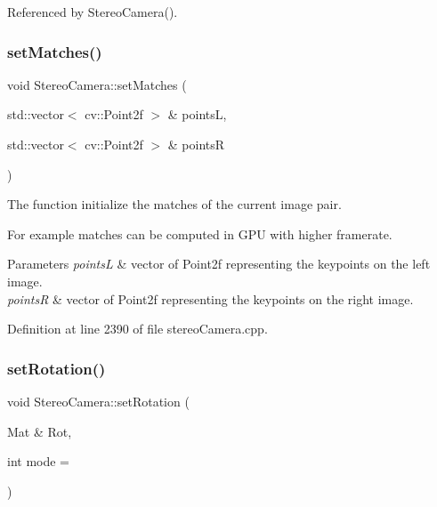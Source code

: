 Referenced by Stereo\+Camera().

\mbox{\label{classStereoCamera_ae683fafa11ea73e4b4c278402be259b6}} 
\subsubsection{\texorpdfstring{setMatches()}{setMatches()}}
{\footnotesize\ttfamily void Stereo\+Camera\+::set\+Matches (\begin{DoxyParamCaption}\item[{std\+::vector$<$ cv\+::\+Point2f $>$ \&}]{pointsL,  }\item[{std\+::vector$<$ cv\+::\+Point2f $>$ \&}]{pointsR }\end{DoxyParamCaption})}



The function initialize the matches of the current image pair. 

For example matches can be computed in G\+PU with higher framerate. 
\begin{DoxyParams}{Parameters}
{\em pointsL} & vector of Point2f representing the keypoints on the left image. \\
\hline
{\em pointsR} & vector of Point2f representing the keypoints on the right image. \\
\hline
\end{DoxyParams}


Definition at line 2390 of file stereo\+Camera.\+cpp.


\begin{DoxyCode}{0}

\end{DoxyCode}
\mbox{\label{classStereoCamera_a1329b3894d527e1505618f57a1304624}} 
\subsubsection{\texorpdfstring{setRotation()}{setRotation()}}
{\footnotesize\ttfamily void Stereo\+Camera\+::set\+Rotation (\begin{DoxyParamCaption}\item[{Mat \&}]{Rot,  }\item[{int}]{mode = {} }\end{DoxyParamCaption})}



